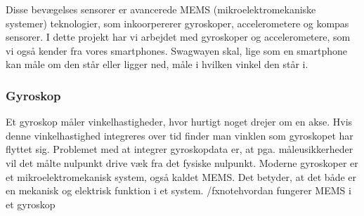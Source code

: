 \documentclass[a4paper,11pt,oneside,article,danish,table]{memoir}
\begin{document}
Disse bevægelses sensorer er avancerede MEMS (mikroelektromekaniske systemer) teknologier, som inkoorpererer gyroskoper, accelerometere og kompas sensorer. %
I dette projekt har vi arbejdet med gyroskoper og accelerometere, som vi også kender fra vores smartphones. Swagwayen skal, lige som en smartphone kan måle om den står eller ligger ned, måle i hvilken vinkel den står i.   

\subsubsection{Gyroskop}
Et gyroskop måler vinkelhastigheder, hvor hurtigt noget drejer om en akse. Hvis denne vinkelhastighed integreres over tid finder man vinklen som gyroskopet har flyttet sig. Problemet med at integrer gyroskopdata er, at pga. måleusikkerheder vil det målte nulpunkt drive væk fra det fysiske nulpunkt. Moderne gyroskoper er et mikroelektromekanisk system, også kaldet MEMS. Det betyder, at det både er en mekanisk og elektrisk funktion i et system. /fxnote{hvordan fungerer MEMS i et gyroskop}
\end{document}
